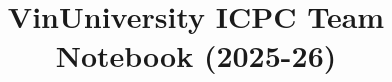 \documentclass[10pt]{article}
\title{\vspace{-4ex}\Large{VinUniversity ICPC Team Notebook (2025-26)}}
\author{}
\date{}
\begin{document}
\begin{landscape}
\begin{multicols}{2}

\maketitle
\vspace{-10ex}
\tableofcontents
\pagestyle{fancy}



\end{multicols}
\end{landscape}
\end{document}
